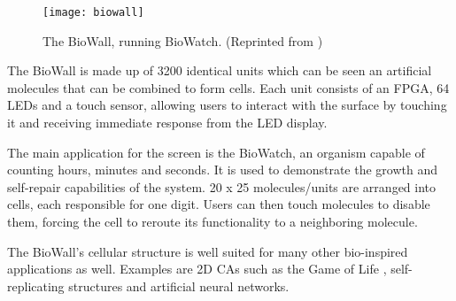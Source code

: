 \begin{figure}[!ht]
    \centering
    \texttt{[image: biowall]}
    \caption[BioWall]{
        The BioWall, running BioWatch.
        (Reprinted from \cite{biowalloverview})
    }
    \label{fig:biowall}
\end{figure}

The BioWall is made up of 3200 identical units which can be seen an artificial molecules that can be combined to form cells.
Each unit consists of an FPGA, 64 LEDs and a touch sensor, allowing users to interact with the surface by touching it and receiving immediate response from the LED display.

The main application for the screen is the BioWatch, an organism capable of counting hours, minutes and seconds.
It is used to demonstrate the growth and self-repair capabilities of the system.
20 x 25 molecules/units are arranged into cells, each responsible for one digit.
Users can then touch molecules to disable them, forcing the cell to reroute its functionality to a neighboring molecule.

The BioWall's cellular structure is well suited for many other bio-inspired applications as well.
Examples are 2D CAs such as the Game of Life \cite{gardner1970life}, self-replicating structures and artificial neural networks.
